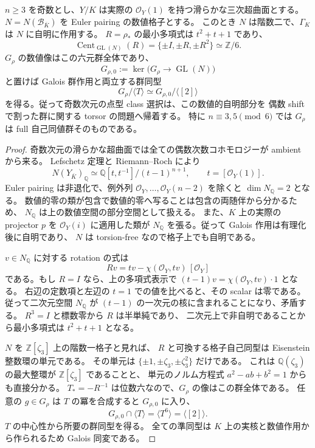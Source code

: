 \begin{proposition}
\label{prop:nfm-odd-numerical-rotation-centralizer}
$n\ge3$ を奇数とし、$Y/K$ は実際の $\mathcal O_Y(1)$ を持つ滑らかな三次超曲面とする。
$N=N(\mathcal B_{\overline K})$ を Euler pairing の数値格子とする。
このとき $N$ は階数二で、$\Gamma_K$ は $N$ に自明に作用する。
$R=\rho_*$ の最小多項式は $t^2+t+1$ であり、
\[
 \operatorname{Cent}_{\operatorname{GL}(N)}(R)
   =\{\pm I,\pm R,\pm R^2\}\simeq\mathbb Z/6.
\]
$G_\rho$ の数値像はこの六元群全体であり、
\[
 G_{\rho,0}:=\ker\bigl(G_\rho\longrightarrow\operatorname{GL}(N)\bigr)
\]
と置けば Galois 群作用と両立する群同型
\[
 \boxed{\quad
 G_\rho/\langle T\rangle\simeq
 G_{\rho,0}/\langle[2]\rangle
 \quad}
\]
を得る。従って奇数次元の点型 class 選択は、この数値的自明部分を
偶数 shift で割った群に関する torsor の問題へ帰着する。
特に $n\equiv3,5\pmod6$ では $G_\rho$ は full 自己同値群そのものである。
\end{proposition}

\begin{proof}
奇数次元の滑らかな超曲面では全ての偶数次数コホモロジーが ambient から来る。
Lefschetz 定理と Riemann--Roch により
\[
 N(Y_{\overline K})_{\mathbb Q}
   \simeq\mathbb Q[t,t^{-1}]/(t-1)^{n+1},\qquad t=[\mathcal O_Y(1)].
\]
Euler pairing は非退化で、例外列
$\mathcal O_Y,\ldots,\mathcal O_Y(n-2)$ を除くと $\dim N_{\mathbb Q}=2$ となる。
数値的零の類が包含で数値的零へ写ることは包含の両随伴から分かるため、
$N_{\mathbb Q}$ は上の数値空間の部分空間として扱える。
また、$K$ 上の実際の projector $p$ を $\mathcal O_Y(i)$ に適用した類が
$N_{\mathbb Q}$ を張る。従って Galois 作用は有理化後に自明であり、
$N$ は torsion-free なので格子上でも自明である。

$v\in N_{\mathbb Q}$ に対する rotation の式は
\[
 Rv=tv-\chi(\mathcal O_Y,tv)\,[\mathcal O_Y]
\]
である。もし $R=I$ なら、上の多項式表示で
$(t-1)v=\chi(\mathcal O_Y,tv)\cdot1$ となる。
右辺の定数項と左辺の $t=1$ での値を比べると、その scalar は零である。
従って二次元空間 $N_{\mathbb Q}$ が $(t-1)$ の一次元の核に含まれることになり、矛盾する。
$R^3=I$ と標数零から $R$ は半単純であり、
二次元上で非自明であることから最小多項式は $t^2+t+1$ となる。

$N$ を $\mathbb Z[\zeta_3]$ 上の階数一格子と見れば、
$R$ と可換する格子自己同型は Eisenstein 整数環の単元である。
その単元は $\{\pm1,\pm\zeta_3,\pm\zeta_3^2\}$ だけである。
これは $\mathbb Q(\zeta_3)$ の最大整環が $\mathbb Z[\zeta_3]$ であることと、
単元のノルム方程式 $a^2-ab+b^2=1$ からも直接分かる。
$T_*=-R^{-1}$ は位数六なので、$G_\rho$ の像はこの群全体である。
任意の $g\in G_\rho$ は $T$ の冪を合成すると $G_{\rho,0}$ に入り、
\[
 G_{\rho,0}\cap\langle T\rangle
     =\langle T^6\rangle=\langle[2]\rangle.
\]
$T$ の中心性から所要の群同型を得る。
全ての準同型は $K$ 上の実核と数値作用から作られるため Galois 同変である。
\end{proof}

